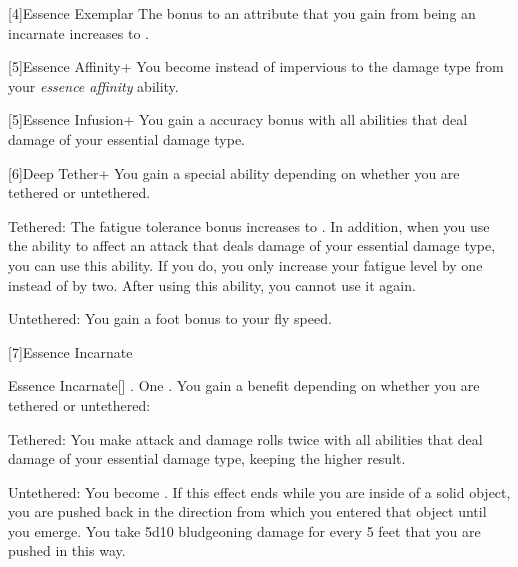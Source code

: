     [4]{Essence Exemplar} The bonus to an attribute that you gain from being an incarnate increases to .

    [5]{Essence Affinity+} You become  instead of impervious to the damage type from your \textit{essence affinity} ability.

    [5]{Essence Infusion+} You gain a  accuracy bonus with all abilities that deal damage of your essential damage type.

    [6]{Deep Tether+} You gain a special ability depending on whether you are tethered or untethered.
    \begin{raggeditemize}
        \item Tethered: The fatigue tolerance bonus increases to .
            In addition, when you use the  ability to affect an attack that deals damage of your essential damage type, you can use this ability.
            If you do, you only increase your fatigue level by one instead of by two.
            After using this ability, you  cannot use it again.
        \item Untethered: You gain a  foot bonus to your fly speed.
    \end{raggeditemize}

    [7]{Essence Incarnate}
    \begin{magicalactiveability}{Essence Incarnate}[]
        \abilityusagetime {}.
        \abilitycost One .
        \rankline
        You gain a benefit depending on whether you are tethered or untethered:
        \begin{raggeditemize}
            \item Tethered: You  make attack and damage rolls twice with all abilities that deal damage of your essential damage type, keeping the higher result.
            \item Untethered: You  become .
            If this effect ends while you are inside of a solid object, you are pushed back in the direction from which you entered that object until you emerge.
            You take 5d10 bludgeoning damage for every 5 feet that you are pushed in this way.
        \end{raggeditemize}

        {}
    \end{magicalactiveability}

